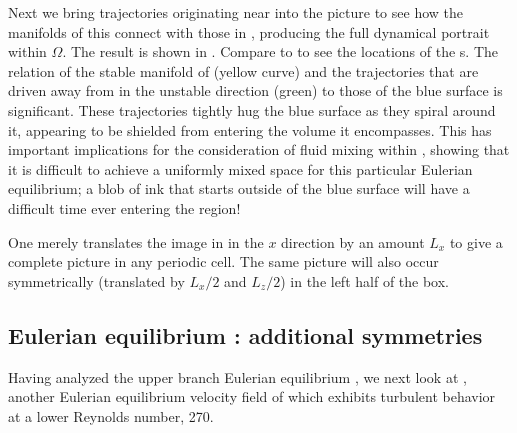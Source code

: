 Next we bring trajectories originating near  into the picture to 
see how the manifolds of this {\stagp} connect with those in 
, producing the full dynamical portrait within 
$\Omega$.  The result is shown in . Compare to 
 to see the locations of the {\stagp}s. 
The relation of the stable manifold of  (yellow curve) and the 
trajectories that are driven away from  in the unstable direction 
(green) to those of the blue surface is significant. These 
trajectories tightly hug the blue surface as they spiral around it, 
appearing to be shielded from entering the volume it encompasses. This 
has important implications for the consideration of fluid mixing 
within {\pCf},  showing that it is difficult to achieve a 
uniformly mixed space for this particular Eulerian equilibrium; a blob of ink that 
starts outside of the blue surface will have a difficult time ever 
entering the region! 
 
One merely translates the image in  in the $x$ 
direction by an amount $L_{x}$ to give a complete picture in any periodic 
cell. The same picture will also occur symmetrically (translated by 
$L_{x}/2$ and $L_{z}/2$) in the left half of the box. 


\subsection{Eulerian equilibrium {\tEQeight}: additional symmetries}
\label{sect:EQ8}

Having analyzed the upper branch Eulerian equilibrium {\tEQtwo}, we next look at 
{\tEQeight}, another Eulerian equilibrium velocity field of {\pCf} which exhibits 
turbulent behavior at a lower Reynolds number, 270.


